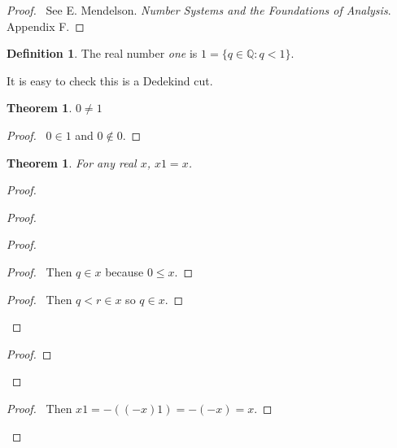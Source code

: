 \documentclass{article}
\let\qed\relax
\newtheorem{theorem}[axiom]{Theorem}
\theoremstyle{definition}
\newtheorem{definition}[axiom]{Definition}
\begin{document}
    \begin{proof}
        \pf\ See E. Mendelson. \emph{Number Systems and the Foundations of Analysis}. Appendix F. \qed
    \end{proof}

    \begin{definition}
        The real number \emph{one} is $1 = \{ q \in \mathbb{Q} : q < 1 \}$.

        It is easy to check this is a Dedekind cut.
    \end{definition}

    \begin{theorem}
        $0 \neq 1$
    \end{theorem}

    \begin{proof}
        \pf\ $0 \in 1$ and $0 \notin 0$. \qed
    \end{proof}

    \begin{theorem}
        For any real $x$, $x1 = x$.
    \end{theorem}

    \begin{proof}
        \pf
        \begin{proof}
            \begin{proof}
                \begin{proof}
                    \pf\ Then $q \in x$ because $0 \leq x$.
                \end{proof}
                \begin{proof}
                    \pf\ Then $q < r \in x$ so $q \in x$.
                \end{proof}
            \end{proof}
            \begin{proof}
            \end{proof}
        \end{proof}
        \begin{proof}
            \pf\ Then $x1 = -((-x)1) = -(-x) = x$.
        \end{proof}
        \qed
    \end{proof}
\end{document}
